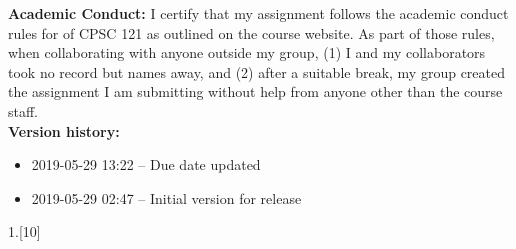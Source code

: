 \documentclass[a4paper, 20pt,fleqn]{article}
\begin{document}
\noindent\textbf{\LARGE Academic Conduct:} 
I certify that my assignment follows the academic conduct rules for of CPSC 121 as outlined on the course website. As part of those rules, when collaborating with anyone outside my group, (1) I and my collaborators took no record but names away, and (2) after a suitable break, my group created the assignment I am submitting without help from anyone other than the course staff. \\

\textbf{Version history:}
\begin{itemize}
    \item 2019-05-29 13:22 -- Due date updated
    \item 2019-05-29 02:47 -- Initial version for release
\end{itemize}

\newpage
\normalsize

\begin{question}{1.}[10]
















\end{question}
\end{document}

